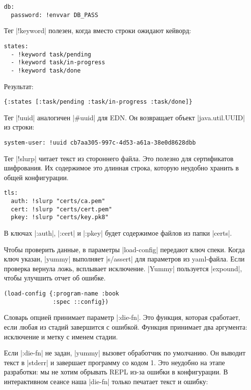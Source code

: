 \begin{verbatim}
db:
  password: !envvar DB_PASS
\end{verbatim}

Тег \spverb|!keyword| полезен, когда вместо строки ожидают кейворд:

\begin{verbatim}
states:
  - !keyword task/pending
  - !keyword task/in-progress
  - !keyword task/done
\end{verbatim}

Результат:

\begin{verbatim}
{:states [:task/pending :task/in-progress :task/done]}
\end{verbatim}

Тег \spverb|!uuid| аналогичен \spverb|#uuid| для EDN. Он возвращает объект
\spverb|java.util.UUID| из строки:

\begin{verbatim}
system-user: !uuid cb7aa305-997c-4d53-a61a-38e0d8628dbb
\end{verbatim}

Тег \spverb|!slurp| читает текст из стороннего файла. Это полезно для
сертификатов шифрования. Их содержимое это длинная строка, которую неудобно
хранить в общей конфигурации.

\begin{verbatim}
tls:
  auth: !slurp "certs/ca.pem"
  cert: !slurp "certs/cert.pem"
  pkey: !slurp "certs/key.pk8"
\end{verbatim}

В ключах \spverb|:auth|, \spverb|:cert| и \spverb|:pkey| будет содержимое файлов
из папки \spverb|certs|.

Чтобы проверить данные, в параметры \spverb|load-config| передают ключ
спеки. Когда ключ указан, \spverb|yummy| выполняет \spverb|s/assert| для
параметров из yaml-файла. Если проверка вернула ложь, всплывает
исключение. \spverb|Yummy| пользуется \spverb|expound|, чтобы улучшить отчет об
ошибке.

\begin{verbatim}
(load-config {:program-name :book
              :spec ::config})
\end{verbatim}

Словарь опцией принимает параметр \spverb|:die-fn|. Это функция, которая
сработает, если любая из стадий завершится с ошибкой. Функция принимает два
аргумента: исключение и метку с именем стадии.

Если \spverb|:die-fn| не задан, \spverb|yummy| вызовет обработчик по
умолчанию. Он выводит текст в \spverb|stderr| и завершает программу со кодом
1. Это неудобно на этапе разработки: мы не хотим обрывать REPL из-за ошибки в
конфигурации. В интерактивном сеансе наша \spverb|die-fn| только печатает текст
и ошибку:

